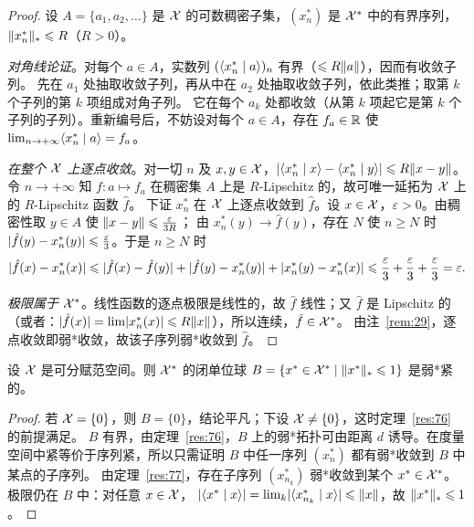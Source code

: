 \begin{proof}
设 $A=\{a_1,a_2,\dots\}$ 是 $\mathcal{X}$ 的可数稠密子集，$(x^*_n)$ 是 $\mathcal{X}^{*}$ 中的有界序列，$\lVert x^*_n\rVert_*\leqslant R$（$R>0$）。

\emph{对角线论证}。对每个 $a\in A$，实数列 $(\langle x^*_n \mid a\rangle)_n$ 有界（$\leqslant R\lVert a\rVert$），因而有收敛子列。
先在 $a_1$ 处抽取收敛子列，再从中在 $a_2$ 处抽取收敛子列，依此类推；取第 $k$ 个子列的第 $k$ 项组成对角子列。
它在每个 $a_k$ 处都收敛（从第 $k$ 项起它是第 $k$ 个子列的子列）。重新编号后，不妨设对每个 $a\in A$，存在 $f_a\in\mathbb{R}$ 使
$\lim_{n\to+\infty}\langle x^*_n \mid a\rangle=f_a$。

\emph{在整个 $\mathcal{X}$ 上逐点收敛}。对一切 $n$ 及 $x,y\in\mathcal{X}$，$\lvert \langle x^*_n \mid x\rangle-\langle x^*_n \mid y\rangle\rvert\leqslant R\lVert x-y\rVert$。
令 $n\to+\infty$ 知 $f:a\mapsto f_a$ 在稠密集 $A$ 上是 $R$-Lipschitz 的，故可唯一延拓为 $\mathcal{X}$ 上的 $R$-Lipschitz 函数 $\hat f$。
下证 $x^*_n$ 在 $\mathcal{X}$ 上逐点收敛到 $\hat f$。设 $x\in\mathcal{X}$，$\varepsilon>0$。由稠密性取 $y\in A$ 使 $\lVert x-y\rVert\leqslant\frac{\varepsilon}{3R}$；
由 $x^*_n(y)\to\hat f(y)$，存在 $N$ 使 $n\geqslant N$ 时 $\lvert \hat f(y)-x^*_n(y)\rvert\leqslant\frac{\varepsilon}{3}$。于是 $n\geqslant N$ 时
\[
  \lvert \hat f(x)-x^*_n(x)\rvert\leqslant\lvert \hat f(x)-\hat f(y)\rvert+\lvert \hat f(y)-x^*_n(y)\rvert+\lvert x^*_n(y)-x^*_n(x)\rvert\leqslant\frac\varepsilon3+\frac\varepsilon3+\frac\varepsilon3=\varepsilon .
\]

\emph{极限属于 $\mathcal{X}^{*}$}。线性函数的逐点极限是线性的，故 $\hat f$ 线性；又 $\hat f$ 是 Lipschitz 的（或者：$\lvert \hat f(x)\rvert=\lim\lvert x^*_n(x)\rvert\leqslant R\lVert x\rVert$），所以连续，$\hat f\in\mathcal{X}^{*}$。
由注~\ref{rem:29}，逐点收敛即弱*收敛，故该子序列弱*收敛到 $\hat f$。
\end{proof}

\begin{theorem}
\label{res:78}
设 $\mathcal{X}$ 是可分赋范空间。则 $\mathcal{X}^{*}$ 的闭单位球 $B=\{x^*\in\mathcal{X}^{*}\mid\lVert x^*\rVert_*\leqslant1\}$ 是弱*紧的。
\end{theorem}

\begin{proof}
若 $\mathcal{X}=\{0\}$，则 $B=\{0\}$，结论平凡；下设 $\mathcal{X}\neq\{0\}$，这时定理~\ref{res:76} 的前提满足。
$B$ 有界，由定理~\ref{res:76}，$B$ 上的弱*拓扑可由距离 $d$ 诱导。在度量空间中紧等价于序列紧，所以只需证明 $B$ 中任一序列 $(x^*_n)$ 都有弱*收敛到 $B$ 中某点的子序列。
由定理~\ref{res:77}，存在子序列 $(x^*_{n_k})$ 弱*收敛到某个 $x^*\in\mathcal{X}^{*}$。极限仍在 $B$ 中：对任意 $x\in\mathcal{X}$，
$\lvert \langle x^* \mid x\rangle\rvert=\lim_k\lvert \langle x^*_{n_k} \mid x\rangle\rvert\leqslant\lVert x\rVert$，故 $\lVert x^*\rVert_*\leqslant1$。
\end{proof}

